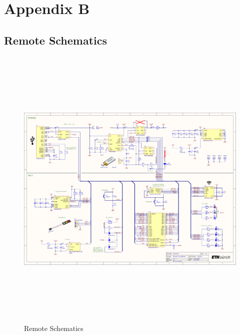 \chapter{Appendix B}
\label{cha:Appendix B}

\section{Remote Schematics}
\label{sec:Schematics}
\begin{figure}[H]
	\centering
	\includegraphics[height=14cm, angle=-90]{../../5_Hardware/WSBR_Board/Project Outputs for WSBR_Board/WSBR_Board.PDF}
	\caption{Remote Schematics}
	\label{fig:Remote Schematics}
\end{figure}
\newpage
